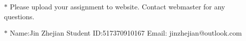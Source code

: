 \documentclass[12pt,a4paper]{article}
\theoremstyle{definition}
\begin{document}
\noindent

\noindent{}
\begin{center}
\footnotesize{\color{red}$*$ Please upload your assignment to website. Contact webmaster for any questions.}

\footnotesize{\color{blue}$*$ Name:Jin Zhejian  \quad Student ID:517370910167 \quad Email: jinzhejian@outlook.com}
\end{center}
\end{document}
